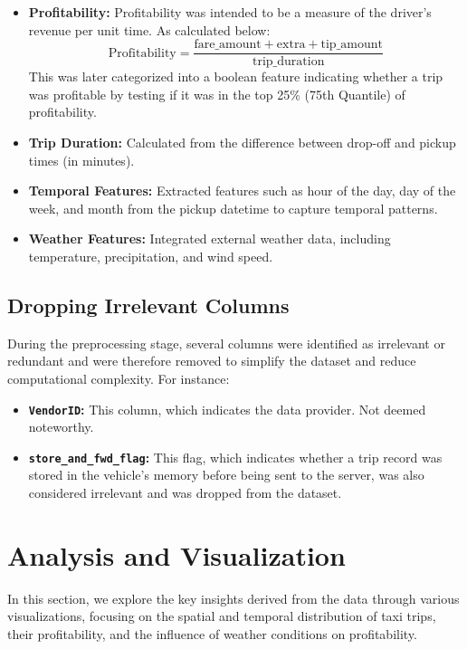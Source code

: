 \documentclass[11pt]{article}
\begin{document}
\begin{itemize}
    \item \textbf{Profitability:} Profitability was intended to be a measure of the driver's revenue per unit time. As calculated below:
    \[
    \text{Profitability} = \frac{\text{fare\_amount} + \text{extra} + \text{tip\_amount}}{\text{trip\_duration}}
    \]
    This was later categorized into a boolean feature indicating whether a trip was profitable by testing if it was in the top 25\% (75th Quantile) of profitability.

    \item \textbf{Trip Duration:} Calculated from the difference between drop-off and pickup times (in minutes).

    \item \textbf{Temporal Features:} Extracted features such as hour of the day, day of the week, and month from the pickup datetime to capture temporal patterns.

    \item \textbf{Weather Features:} Integrated external weather data, including temperature, precipitation, and wind speed.
\end{itemize}

\subsection{Dropping Irrelevant Columns}

During the preprocessing stage, several columns were identified as irrelevant or redundant and were therefore removed to simplify the dataset and reduce computational complexity. For instance:

\begin{itemize}
    \item \textbf{\texttt{VendorID}:} This column, which indicates the data provider. Not deemed noteworthy.

    \item \textbf{\texttt{store\_and\_fwd\_flag}:} This flag, which indicates whether a trip record was stored in the vehicle's memory before being sent to the server, was also considered irrelevant and was dropped from the dataset.
\end{itemize}

\section{Analysis and Visualization}

In this section, we explore the key insights derived from the data through various visualizations, focusing on the spatial and temporal distribution of taxi trips, their profitability, and the influence of weather conditions on profitability.
\end{document}
